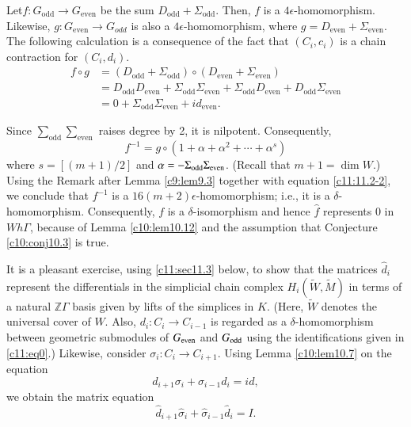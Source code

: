 Let\pageoriginale $f : G_{\text{odd}} \to G_{\text{even}}$ be the sum
$D_{\text{odd}}+ \Sigma_{\text{odd}}$. Then, $f$ is a $4
\epsilon$-homomorphism. Likewise, $g: G_{\text{even}}\to G_{odd}$ is
also a $4 \epsilon$-homomor\-phism, where $g= D_{\text{even}} +
\Sigma_{\text{even}}$. The following calculation is a consequence of
the fact that $(C_i, c_i)$ is a chain contraction for $(C_i, d_i)$.
\begin{equation*}
  \begin{aligned}
    f \circ g & = (D_{\text{odd}}+ \Sigma_{\text{odd}}) \circ
    (D_{\text{even}}+\Sigma_{\text{even}})\\
    & = D_{\text{odd}} D_{\text{even}} + \Sigma_{\text{odd}}
    \Sigma_{\text{even}} + \Sigma_{\text{odd}} D_{\text{even}} +
    D_{\text{odd}} \Sigma_{\text{even}}\\
    & = 0+ \Sigma_{\text{odd}} \Sigma_{\text{even}}+ id_{\text{even}}.
  \end{aligned}\tag{1}\label{c11:11.2-1}
\end{equation*}

Since $\sum_{\text{odd}} \sum_{\text{even}}$ raises degree by 2, it is
nilpotent. Consequently,
\begin{equation*}
  f^{-1} = g\circ (1+ \alpha + \alpha^2+ \cdots +
  \alpha^s)\tag{2}\label{c11:11.2-2} 
\end{equation*}
where $s= [(m+1)/2]$ and $\alpha=- \Sigma_{\operatorname{odd}}
\Sigma_{\operatorname{even}}$. (Recall that $m+1= \dim W$.) Using the Remark after
Lemma \ref{c9:lem9.3} together with equation \eqref{c11:11.2-2}, we
conclude that $f^{-1}$ is a $16 (m+2) \epsilon$-homomorphism; i.e.,
it is a $\delta$-homomorphism. Consequently, $f$ is a
$\delta$-isomorphism and hence $\hat{f}$ represents 0 in $Wh\Gamma$,
because of Lemma \ref{c10:lem10.12} and the assumption that Conjecture
\ref{c10:conj10.3} is true.

It is a pleasant exercise, using \ref{c11:sec11.3} below, to show that
the matrices $\hat{d}_i$ represent the differentials in the simplicial
chain complex $H_i (\tilde{W} , \tilde{M})$ in terms of a natural
$\mathbb{Z}\Gamma$ basis given by lifts of the simplices in
$K$. (Here, $\tilde{W}$ denotes the universal cover of $W$. Also, $d_i
: C_i \to C_{i-1}$ is regarded as a $\delta$-homomorphism between
geometric submodules of $G_{\operatorname{even}}$ and $G_{\operatorname{odd}}$ using the
identifications given in \eqref{c11:eq0}.) Likewise, consider
$\sigma_i : C_i \to C_{i+1}$. Using Lemma \ref{c10:lem10.7} on the
equation
$$
d_{i+1} \sigma_i + \sigma_{i-1} d_i = id,
$$    
we obtain the matrix equation
$$
\hat{d}_{i+1} \hat{\sigma}_i + \hat{\sigma}_{i-1} \hat{d}_i=I.
$$

